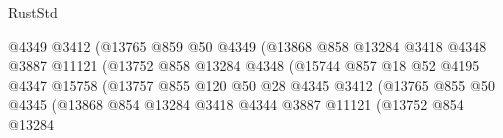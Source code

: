 \begin{lexlean}{RustStd}
\begin{coremodule}
                                            @4349
                                            @3412
                                            (@13765
                                              @859
                                              @50
                                              @4349
                                              (@13868
                                                @858
                                                @13284
                                                @3418
                                                @4348
                                                @3887
                                                @11121
                                                (@13752
                                                  @858
                                                  @13284
                                                  @4348
                                                  (@15744
                                                    @857
                                                    @18
                                                    @52
                                                    @4195
                                                    @4347
                                                    @15758
                                                    (@13757
                                                      @855
                                                      @120
                                                      @50
                                                      @28
                                                      @4345
                                                      @3412
                                                      (@13765
                                                        @855
                                                        @50
                                                        @4345
                                                        (@13868
                                                          @854
                                                          @13284
                                                          @3418
                                                          @4344
                                                          @3887
                                                          @11121
                                                          (@13752
                                                            @854
                                                            @13284

\end{coremodule}
\end{lexlean}
